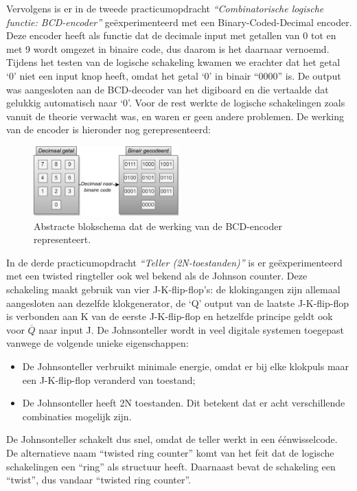 \documentclass[12pt]{article}
\begin{document}
Vervolgens is er in de tweede practicumopdracht \textit{``Combinatorische logische functie: BCD-encoder''} geëxperimenteerd met een Binary-Coded-Decimal encoder. 
Deze encoder heeft als functie dat de decimale input met getallen van 0 tot en met 9 wordt omgezet in binaire code, dus daarom is het daarnaar vernoemd. 
Tijdens het testen van de logische schakeling kwamen we erachter dat het getal `0' niet een input knop heeft, omdat het getal `0' in binair ``0000'' is. 
De output was aangesloten aan de BCD-decoder van het digiboard en die vertaalde dat gelukkig automatisch naar `0'.   
Voor de rest werkte de logische schakelingen zoals vanuit de theorie verwacht was, en waren er geen andere problemen. 
De werking van de encoder is hieronder nog gerepresenteerd:
\pagebreak
\begin{figure}[h]
    \centering
    \includegraphics[width=0.5\textwidth]{conc.png}
    \caption{Abstracte blokschema dat de werking van de BCD-encoder representeert.}
    \label{fig:rds}
\end{figure} 

In de derde practicumopdracht \textit{``Teller (2N-toestanden)''} is er geëxperimenteerd met een twisted ringteller ook wel bekend als de Johnson counter. 
Deze schakeling maakt gebruik van vier J-K-flip-flop's: de klokingangen zijn allemaal aangesloten aan dezelfde klokgenerator, de `Q' output van de laatste J-K-flip-flop is verbonden aan K van de eerste J-K-flip-flop en hetzelfde principe geldt ook voor $\overline{Q}$ naar input J. 
De Johnsonteller wordt in veel digitale systemen toegepast vanwege de volgende unieke eigenschappen:
\begin{itemize}
    \item De Johnsonteller verbruikt minimale energie, omdat er bij elke klokpuls maar een J-K-flip-flop veranderd van toestand;
    \item De Johnsonteller heeft 2N toestanden. Dit betekent dat er acht verschillende combinaties mogelijk zijn.
\end{itemize}
De Johnsonteller schakelt dus snel, omdat de teller werkt in een éénwisselcode. De alternatieve naam ``twisted ring counter'' komt van het feit dat de logische schakelingen een ``ring'' als structuur heeft. Daarnaast bevat de schakeling een ``twist'', dus vandaar ``twisted ring counter''. 
\end{document}
